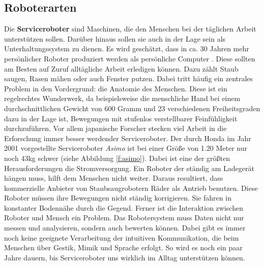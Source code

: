 \subsection{Roboterarten}
Die \textbf{Serviceroboter} sind Maschinen, die den Menschen bei der täglichen Arbeit unterstützen sollen. Darüber hinaus sollen sie auch in der Lage sein als Unterhaltungssystem zu dienen. Es wird geschätzt, dass in ca. 30 Jahren mehr persönlicher Roboter produziert werden als persönliche Computer \cite{Haun2007}.
Diese sollten am Besten auf Zuruf alltägliche Arbeit erledigen können. Dazu zählt Staub saugen, Rasen mähen oder auch Fenster putzen. Dabei tritt häufig ein zentrales Problem in den Vordergrund: die Anatomie des Menschen. Diese ist ein regelrechtes Wunderwerk, da beispielsweise die menschliche Hand bei einem durchschnittlichen Gewicht von 600 Gramm und 23 verschiedenen Freiheitsgraden dazu in der Lage ist, Bewegungen mit stufenlos verstellbarer Feinfühligkeit durchzuführen. Vor allem japanische Forscher stecken viel Arbeit in die Erforschung immer besser werdender Serviceroboter. Der durch Honda im Jahr 2001 vorgestellte Serviceroboter \textit{Asimo} ist bei einer Größe von 1.20 Meter nur noch 43kg schwer (siehe Abbildung \ref{f:asimo}).
Dabei ist eine der größten Herausforderungen die Stromversorgung. Ein Roboter der ständig am Ladegerät hängen muss, hilft dem Menschen nicht weiter. Daraus resultiert, dass kommerzielle Anbieter von Staubsaugrobotern Räder als Antrieb benutzen. Diese Roboter müssen ihre Bewegungen nicht ständig korrigieren. Sie fahren in konstanter Bodennähe durch die Gegend. Ferner ist die Interaktion zwischen Roboter und Mensch ein Problem. Das Robotersystem muss Daten nicht nur messen und analysieren, sondern auch bewerten können. Dabei gibt es immer noch keine geeignete Verarbeitung der intuitiven Kommunikation, die beim Menschen über Gestik, Mimik und Sprache erfolgt. So wird es noch ein paar Jahre dauern, bis Serviceroboter uns wirklich im Alltag unterstützen können.
